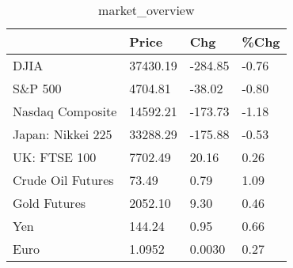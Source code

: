 \documentclass{article}%
\begin{document}
%


\begin{table}[htbp]%
\caption{market\_overview}%
\centering%
\begin{adjustbox}{width=1\textwidth}%
\begin{tabular}{llll}
\toprule
                  &    Price &     Chg &  \%Chg \\
\midrule
             DJIA & 37430.19 & -284.85 & -0.76 \\
          S\&P 500 &  4704.81 &  -38.02 & -0.80 \\
 Nasdaq Composite & 14592.21 & -173.73 & -1.18 \\
Japan: Nikkei 225 & 33288.29 & -175.88 & -0.53 \\
     UK: FTSE 100 &  7702.49 &   20.16 &  0.26 \\
Crude Oil Futures &    73.49 &    0.79 &  1.09 \\
     Gold Futures &  2052.10 &    9.30 &  0.46 \\
              Yen &   144.24 &    0.95 &  0.66 \\
             Euro &   1.0952 &  0.0030 &  0.27 \\
\bottomrule
\end{tabular}
%
\end{adjustbox}%
\end{table}

%
\end{document}
